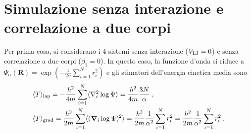\documentclass[a4paper, titlepage]{article}
\begin{document}
\section{Simulazione senza interazione e correlazione a due corpi}
Per prima cosa, si considerano i 4 sistemi senza interazione ($V_{\rm LJ} = 0$) e senza correlazione a due corpi ($\beta_1 = 0$). In questo caso, la funzione d'onda si riduce a $\displaystyle \Psi_\alpha(\mathbf{R}) = \exp(-\frac{1}{2\alpha}\sum_{i = 1}^Nr_i^2)$ e gli stimatori dell'energia cinetica media sono
\begin{align*}
    &\langle T \rangle _{\rm lap} = -\frac{\hbar^2}{4m}
    \sum_{i = 1}^N
    \langle\nabla_i^2\log\Psi\rangle = \frac{\hbar^2}{4m} \frac{3N}{\alpha}\, ,\\
    &\langle T \rangle _{\rm grad} = \frac{\hbar^2}{2m}
    \sum_{i = 1}^N
    \langle(\boldsymbol{\nabla}_i\log\Psi)^2\rangle =
    \frac{\hbar^2}{2m} \frac{1}{\alpha^2}
    \sum_{i=1}^N r_i^2 = \frac{\hbar^2}{2m} \frac{1}{\alpha^2}\sum_{i=1}^N r_i^2\, .
\end{align*}
\end{document}
